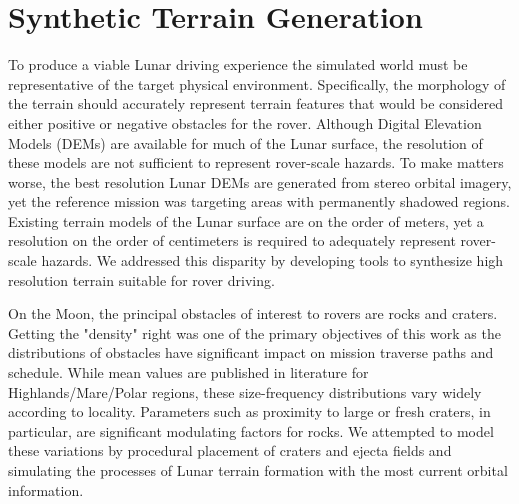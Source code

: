 \documentclass[twocolumn,letterpaper]{IEEEAerospaceCLS}  %
\begin{document}
\section{Synthetic Terrain Generation}
\label{sec:terrain-gen}

To produce a viable Lunar driving experience the simulated world must be representative of the target physical environment. 
Specifically, the morphology of the terrain should accurately represent terrain features that would be considered either positive or negative obstacles for the rover. 
Although Digital Elevation Models (DEMs) are available for much of the Lunar surface, the resolution of these models are not sufficient to represent rover-scale hazards. 
To make matters worse, the best resolution Lunar DEMs are generated from stereo orbital imagery, yet the reference mission was targeting areas with permanently shadowed regions. 
Existing terrain models of the Lunar surface are on the order of meters, yet a resolution on the order of centimeters is required to adequately represent rover-scale hazards. 
We addressed this disparity by developing tools to synthesize high resolution terrain suitable for rover driving. 

On the Moon, the principal obstacles of interest to rovers are rocks and craters. 
Getting the "density" right was one of the primary objectives of this work as the distributions of obstacles have significant impact on mission traverse paths and schedule. 
While mean values are published in literature \cite{Surveyor1968} for Highlands/Mare/Polar regions, these size-frequency distributions vary widely according to locality. 
Parameters such as proximity to large or fresh craters, in particular, are significant modulating factors for rocks. 
We attempted to model these variations by procedural placement of craters and ejecta fields and simulating the processes of Lunar terrain formation with the most current orbital information. 
\end{document}
